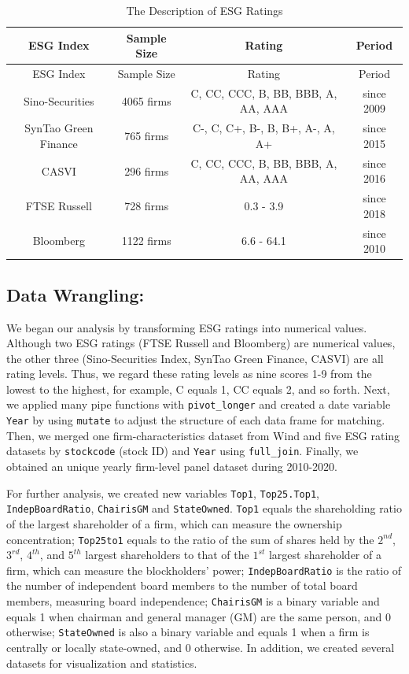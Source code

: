 \documentclass[
  12pt,
]{article}
\begin{document}
\begin{longtable}[]{@{}cccc@{}}
\caption{The Description of ESG Ratings}\tabularnewline
\toprule
ESG Index & Sample Size & Rating & Period \\
\midrule
\endfirsthead
\toprule
ESG Index & Sample Size & Rating & Period \\
\midrule
\endhead
Sino-Securities & 4065 firms & C, CC, CCC, B, BB, BBB, A, AA, AAA &
since 2009 \\
SynTao Green Finance & 765 firms & C-, C, C+, B-, B, B+, A-, A, A+ &
since 2015 \\
CASVI & 296 firms & C, CC, CCC, B, BB, BBB, A, AA, AAA & since 2016 \\
FTSE Russell & 728 firms & 0.3 - 3.9 & since 2018 \\
Bloomberg & 1122 firms & 6.6 - 64.1 & since 2010 \\
\bottomrule
\end{longtable}

\hypertarget{data-wrangling}{%
\subsection{Data Wrangling:}\label{data-wrangling}}

We began our analysis by transforming ESG ratings into numerical values.
Although two ESG ratings (FTSE Russell and Bloomberg) are numerical
values, the other three (Sino-Securities Index, SynTao Green Finance,
CASVI) are all rating levels. Thus, we regard these rating levels as
nine scores 1-9 from the lowest to the highest, for example, C equals 1,
CC equals 2, and so forth. Next, we applied many pipe functions with
\texttt{pivot\_longer} and created a date variable \texttt{Year} by
using \texttt{mutate} to adjust the structure of each data frame for
matching. Then, we merged one firm-characteristics dataset from Wind and
five ESG rating datasets by \texttt{stockcode} (stock ID) and
\texttt{Year} using \texttt{full\_join}. Finally, we obtained an unique
yearly firm-level panel dataset during 2010-2020.

For further analysis, we created new variables \texttt{Top1},
\texttt{Top25.Top1}, \texttt{IndepBoardRatio}, \texttt{ChairisGM} and
\texttt{StateOwned}. \texttt{Top1} equals the shareholding ratio of the
largest shareholder of a firm, which can measure the ownership
concentration; \texttt{Top25to1} equals to the ratio of the sum of
shares held by the \(2^{nd}\), \(3^{rd}\), \(4^{th}\), and \(5^{th}\)
largest shareholders to that of the \(1^{st}\) largest shareholder of a
firm, which can measure the blockholders' power;
\texttt{IndepBoardRatio} is the ratio of the number of independent board
members to the number of total board members, measuring board
independence; \texttt{ChairisGM} is a binary variable and equals 1 when
chairman and general manager (GM) are the same person, and 0 otherwise;
\texttt{StateOwned} is also a binary variable and equals 1 when a firm
is centrally or locally state-owned, and 0 otherwise. In addition, we
created several datasets for visualization and statistics.
\end{document}
